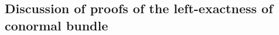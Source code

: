 \subsection{Discussion of proofs of the left-exactness of conormal bundle}
%
%
%
%
%
%
%
%
%
%
%
%
%
